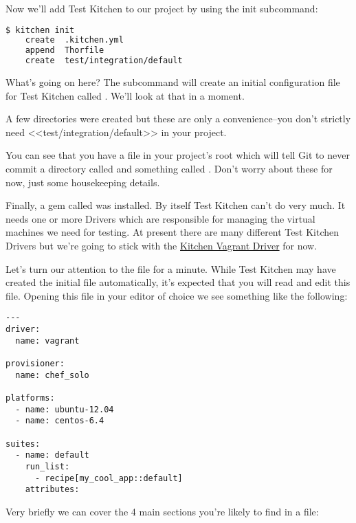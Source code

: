 Now we'll add Test Kitchen to our project by using the init subcommand:

\begin{lstlisting}[language=Bash,label=lst:testing-test-kitchen3]
$ kitchen init
    create  .kitchen.yml
    append  Thorfile
    create  test/integration/default
\end{lstlisting}

What's going on here? The  subcommand will create an initial configuration file for Test Kitchen called . We'll look at that in a moment.

A few directories were created but these are only a convenience–you don't strictly need <<test/integration/default>> in your project.

You can see that you have a  file in your project's root which will tell Git to never commit a directory called  and something called . Don't worry about these for now, just some housekeeping details.

Finally, a gem called  was installed. By itself Test Kitchen can't do very much. It needs one or more Drivers which are responsible for managing the virtual machines we need for testing. At present there are many different Test Kitchen Drivers but we're going to stick with the \href{https://github.com/opscode/kitchen-vagrant}{Kitchen Vagrant Driver} for now.

Let's turn our attention to the  file for a minute. While Test Kitchen may have created the initial file automatically, it's expected that you will read and edit this file. Opening this file in your editor of choice we see something like the following:

\begin{lstlisting}[label=lst:testing-test-kitchen4]
---
driver:
  name: vagrant

provisioner:
  name: chef_solo

platforms:
  - name: ubuntu-12.04
  - name: centos-6.4

suites:
  - name: default
    run_list:
      - recipe[my_cool_app::default]
    attributes:
\end{lstlisting}

Very briefly we can cover the 4 main sections you're likely to find in a  file:

